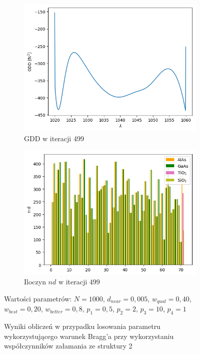 \begin{figure} [H]
\begin{subfigure}[b]{0.31\textwidth}
        \includegraphics[width=\linewidth]{figures/wyniki/1stopien/opt1000/result_gddresult499.png}
        \caption{GDD w iteracji 499}
    \end{subfigure}
        \begin{subfigure}[b]{0.32\textwidth}
        \includegraphics[width=\linewidth]{figures/wyniki/1stopien/opt1000/result_ndresult499.png}
        \caption{Iloczyn $nd$ w iteracji 499}
    \end{subfigure}
    \caption{Wyniki obliczeń w przypadku losowania parametru wykorzystującego warunek Bragg'a przy wykorzystaniu współczynników załamania ze struktury 2}
    Wartości parametrów: $N= 1000$, $d_{near}= 0,005$, $w_{qual}=0,40$, $w_{best}=0,20$, $w_{better}=0,8$, $p_1=0,5$, $p_2=2$, $p_3=10$, $p_4=1$
    \label{fig:wyn1stpopt1}
\end{figure}

